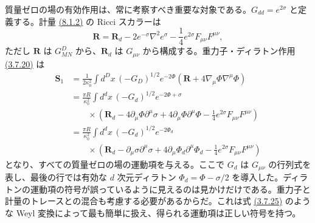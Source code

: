 質量ゼロの場の有効作用は、常に考察すべき重要な対象である。$G_{dd}=e^{2\sigma}$ と定義する。計量 \hyperref[eq:8.1.2]{(8.1.2)} の Ricci スカラーは
\begin{equation}
\bm R=\bm R_d-2e^{-\sigma}\nabla^2e^\sigma-\frac14e^{2\sigma}F_{\mu\nu}F^{\mu\nu},
\tag{8.1.8}\label{eq:8.1.8}
\end{equation}
ただし $\bm R$ は $G^D_{MN}$ から、$\bm R_d$ は $G_{\mu\nu}$ から構成する。重力子・ディラトン作用 \hyperref[eq:3.7.20]{(3.7.20)} は
\begin{equation}
\begin{aligned}
\bm S_1&=\frac1{2\kappa_0^2}\int d^Dx\,(-G_D)^{1/2}e^{-2\Phi}
(\bm R+4\nabla_\mu\Phi\nabla^\mu\Phi)\\
&=\frac{\pi R}{\kappa_0^2}\int d^dx\,(-G_d)^{1/2}e^{-2\Phi+\sigma}\\
&\qquad\times\left(\bm R_d-4\partial_\mu\Phi\partial^\mu\sigma
+4\partial_\mu\Phi\partial^\mu\Phi-\frac14e^{2\sigma}F_{\mu\nu}F^{\mu\nu}\right)\\
&=\frac{\pi R}{\kappa_0^2}\int d^dx\,(-G_d)^{1/2}e^{-2\Phi_d}\\
&\qquad\times\left(\bm R_d-\partial_\mu\sigma\partial^\mu\sigma
+4\partial_\mu\Phi_d\partial^\mu\Phi_d-\frac14e^{2\sigma}F_{\mu\nu}F^{\mu\nu}\right)
\end{aligned}
\tag{8.1.9}\label{eq:8.1.9}
\end{equation}
となり、すべての質量ゼロの場の運動項を与える。ここで $G_d$ は $G_{\mu\nu}$ の行列式を表し、最後の行では有効な $d$ 次元ディラトン $\Phi_d=\Phi-\sigma/2$ を導入した。ディラトンの運動項の符号が誤っているように見えるのは見かけだけである。重力子と計量のトレースとの混合も考慮する必要があるからだ。これは式 \hyperref[eq:3.7.25]{(3.7.25)} のような Weyl 変換によって最も簡単に扱え、得られる運動項は正しい符号を持つ。

